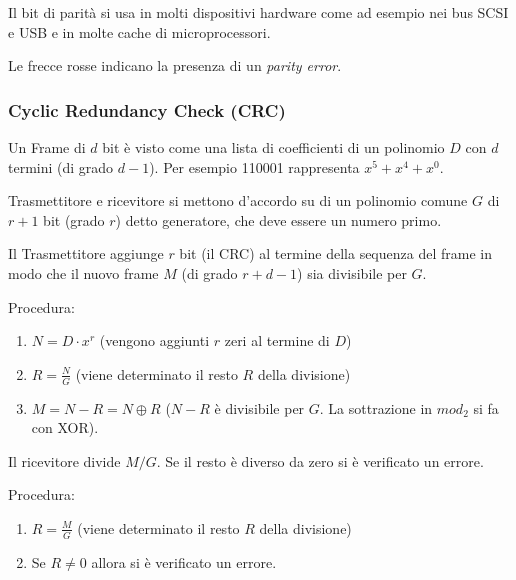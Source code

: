             Il bit di parità si usa in molti dispositivi hardware come ad esempio nei bus SCSI e USB e in molte cache di microprocessori.

            
            \vbox{}
            

            Le frecce rosse indicano la presenza di un \textit{parity error}.

        \subsubsection{Cyclic Redundancy Check (CRC)}
            Un Frame di $d$ bit è visto come una lista di coefficienti di un polinomio $D$ con $d$ termini (di grado $d-1$). Per esempio 110001 rappresenta $x^5 + x^4 + x^0$.

            Trasmettitore e ricevitore si mettono d'accordo su di un polinomio comune $G$ di $r + 1$ bit (grado $r$) detto generatore, che deve essere un numero primo.

            Il Trasmettitore aggiunge $r$ bit (il CRC) al termine della sequenza del frame in modo che il nuovo frame $M$ (di grado $r+d-1$) sia divisibile per $G$.

            Procedura:
            \begin{enumerate}
                \item $N = D \cdot x^r$ (vengono aggiunti $r$ zeri al termine di $D$)
                \item $R = \frac{N}{G}$ (viene determinato il resto $R$ della divisione)
                \item $M = N - R = N \oplus R$ ($N-R$ è divisibile per $G$. La sottrazione in $mod_2$ si fa con XOR).
            \end{enumerate}

            Il ricevitore divide $M/G$. Se il resto è diverso da zero si è verificato un errore.

            Procedura:
            \begin{enumerate}
                \item $R = \frac{M}{G}$ (viene determinato il resto $R$ della divisione)
                \item Se $R \neq 0$ allora si è verificato un errore.
            \end{enumerate}

